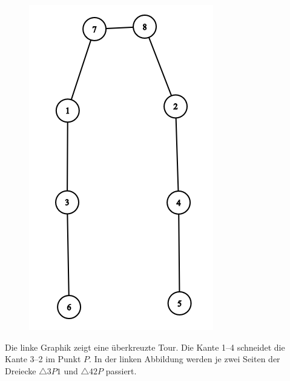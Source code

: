 \begin{figure}[h]
\begin{minipage}[b]{0.3\textwidth}
    \end{minipage}
    \hfill
    \begin{minipage}[b]{0.26\textwidth}
        \includegraphics[width=\textwidth]{2opt2}
    \end{minipage}\label{fig:2opt}
\end{figure}
Die linke Graphik zeigt eine überkreuzte Tour.
Die Kante 1--4 schneidet die Kante 3--2 im Punkt $P$.
In der linken Abbildung werden je zwei Seiten der Dreiecke $\triangle{3P1}$ und $\triangle{42P}$ passiert.
